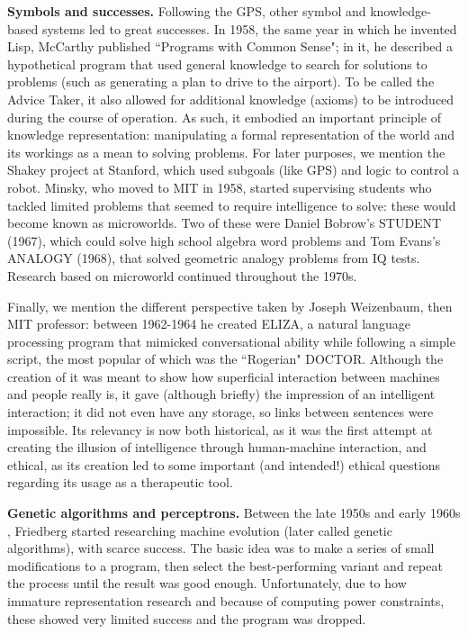 \documentclass[../main.tex]{subfiles}
\begin{document}
\vspace{4pt}
\textbf{Symbols and successes.}
Following the GPS, other symbol and knowledge-based systems led to great successes. In 1958, the same year in which he invented Lisp, McCarthy published ``Programs with Common Sense"\cite{mccarthyProgramsCommonSense1960}; in it, he described a hypothetical program that used general knowledge to search for solutions to problems (such as generating a plan to drive to the airport). To be called the Advice Taker, it also allowed for additional knowledge (axioms) to be introduced during the course of operation. As such, it embodied an important principle of knowledge representation: manipulating a formal representation of the world and its workings as a mean to solving problems.
For later purposes, we mention the Shakey project at Stanford, which used subgoals (like GPS) and logic to control a robot. Minsky, who moved to MIT in 1958, started supervising students who tackled limited problems that seemed to require intelligence to solve: these would become known as microworlds. Two of these were Daniel Bobrow's STUDENT (1967), which could solve high school algebra word problems and Tom Evans's ANALOGY (1968), that solved geometric analogy problems from IQ tests. Research based on microworld continued throughout the 1970s.

Finally, we mention the different perspective taken by Joseph Weizenbaum, then MIT professor: between 1962-1964 he created ELIZA, a natural language processing program that mimicked conversational ability while following a simple script, the most popular of which was the ``Rogerian" DOCTOR. Although the creation of it was meant to show how superficial interaction between machines and people really is, it gave (although briefly) the impression of an intelligent interaction; it did not even have any storage, so links between sentences were impossible. Its relevancy is now both historical, as it was the first attempt at creating the illusion of intelligence through human-machine interaction, and ethical, as its creation led to some important (and intended!) ethical questions regarding its usage as a therapeutic tool.

\vspace{4pt}
\textbf{Genetic algorithms and perceptrons.}
Between the late 1950s and early 1960s \cite{friedbergLearningMachinePart1958}, Friedberg started researching machine evolution (later called genetic algorithms), with scarce success. The basic idea was to make a series of small modifications to a program, then select the best-performing variant and repeat the process until the result was good enough. Unfortunately, due to how immature representation research and because of computing power constraints, these showed very limited success and the program was dropped.
\end{document}
